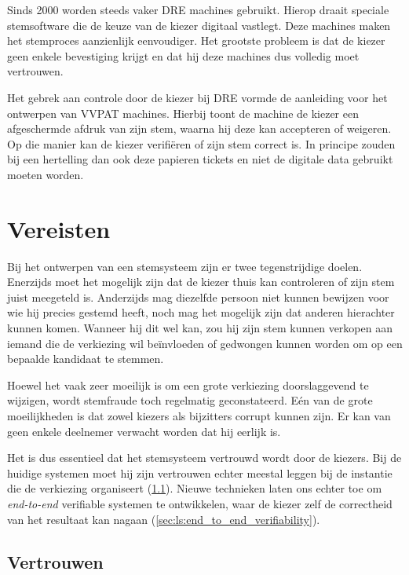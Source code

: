 \npar Sinds 2000 worden steeds vaker DRE machines gebruikt. Hierop draait speciale stemsoftware die de keuze van de kiezer digitaal vastlegt. Deze machines maken het stemproces aanzienlijk eenvoudiger. Het grootste probleem is dat de kiezer geen enkele bevestiging krijgt en dat hij deze machines dus volledig moet vertrouwen.\cite{wiki:dre_voting_machine}

\npar Het gebrek aan controle door de kiezer bij DRE vormde de aanleiding voor het ontwerpen van VVPAT machines. Hierbij toont de machine de kiezer een afgeschermde afdruk van zijn stem, waarna hij deze kan accepteren of weigeren. Op die manier kan de kiezer verifi\"eren of zijn stem correct is. In principe zouden bij een hertelling dan ook deze papieren tickets en niet de digitale data gebruikt moeten worden.\cite{mercuri_voting_machine_risks}

\section{Vereisten}
\label{sec:ls:vereisten}

Bij het ontwerpen van een stemsysteem zijn er twee tegenstrijdige doelen. Enerzijds moet het mogelijk zijn dat de kiezer thuis kan controleren of zijn stem juist meegeteld is. Anderzijds mag diezelfde persoon niet kunnen bewijzen voor wie hij precies gestemd heeft, noch mag het mogelijk zijn dat anderen hierachter kunnen komen. Wanneer hij dit wel kan, zou hij zijn stem kunnen verkopen aan iemand die de verkiezing wil beïnvloeden of gedwongen kunnen worden om op een bepaalde kandidaat te stemmen.

\npar Hoewel het vaak zeer moeilijk is om een grote verkiezing doorslaggevend te wijzigen, wordt stemfraude toch regelmatig geconstateerd.\cite{adida_advances_in_cryptographic_voting_systems} E\'en van de grote moeilijkheden is dat zowel kiezers als bijzitters corrupt kunnen zijn. Er kan van geen enkele deelnemer verwacht worden dat hij eerlijk is.

\npar Het is dus essentieel dat het stemsysteem vertrouwd wordt door de kiezers. Bij de huidige systemen moet hij zijn vertrouwen echter meestal leggen bij de instantie die de verkiezing organiseert (\ref{sec:ls:vertrouwen}). Nieuwe technieken laten ons echter toe om \textit{end-to-end} verifiable systemen te ontwikkelen, waar de kiezer zelf de correctheid van het resultaat kan nagaan (\ref{sec:ls:end_to_end_verifiability}).

\subsection{Vertrouwen}
\label{sec:ls:vertrouwen}

